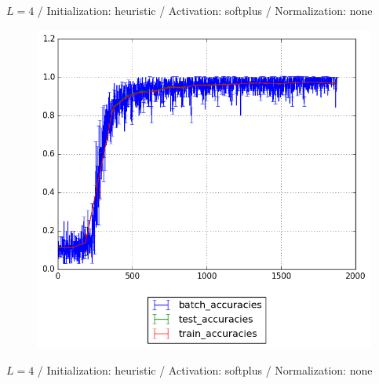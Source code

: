 \documentclass{beamer}
\begin{document}
{	%
	\begin{frame}[t]{}{}%
		\vfill
		\begin{center}
			{$L = 4$ / Initialization: heuristic / Activation: softplus / Normalization: none}
		\end{center}
    		\begin{figure}
    			\centering
    			\includegraphics[scale=0.4]{gfx/l4b32_softplus_heuristic_identity_cnn_accuracies}
    		\end{figure}
    		\vfill
	\end{frame}
	\begin{frame}[t]{}{}%
		\vfill
		\begin{center}
			{$L = 4$ / Initialization: heuristic / Activation: softplus / Normalization: none}
		\end{center}
    		\begin{figure}
    			\centering

\end{figure}
\end{frame}}
\end{document}
